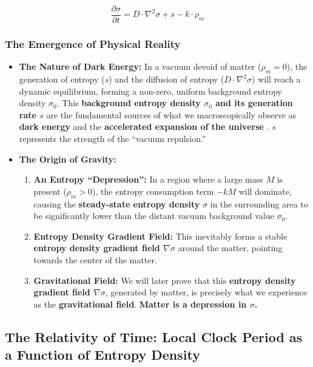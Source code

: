 \documentclass[11pt, a4paper]{article}
\begin{document}
\[
\frac{\partial\sigma}{\partial t} = D \cdot \nabla^2\sigma + s - k \cdot \rho_m
\]

\subsubsection{The Emergence of Physical Reality}

\begin{itemize}
    \item \textbf{The Nature of Dark Energy:} In a vacuum devoid of matter ($\rho_m = 0$), the generation of entropy ($s$) and the diffusion of entropy ($D \cdot \nabla^2\sigma$) will reach a dynamic equilibrium, forming a non-zero, uniform background entropy density $\sigma_0$. This \textbf{background entropy density $\sigma_0$ and its generation rate $s$} are the fundamental sources of what we macroscopically observe as \textbf{dark energy} and the \textbf{accelerated expansion of the universe} \cite{Planck2020}. $s$ represents the strength of the ``vacuum repulsion.''

    \item \textbf{The Origin of Gravity:}
    \begin{enumerate}
        \item \textbf{An Entropy ``Depression'':} In a region where a large mass $M$ is present ($\rho_m > 0$), the entropy consumption term $-kM$ will dominate, causing the \textbf{steady-state entropy density} $\sigma$ in the surrounding area to be significantly lower than the distant vacuum background value $\sigma_0$.
        \item \textbf{Entropy Density Gradient Field:} This inevitably forms a stable \textbf{entropy density gradient field $\nabla\sigma$} around the matter, pointing towards the center of the matter.
        \item \textbf{Gravitational Field:} We will later prove that this \textbf{entropy density gradient field $\nabla\sigma$}, generated by matter, is precisely what we experience as the \textbf{gravitational field}. \textbf{Matter is a depression in $\sigma$.}
    \end{enumerate}
\end{itemize}

\subsection{The Relativity of Time: Local Clock Period as a Function of Entropy Density}
\end{document}
